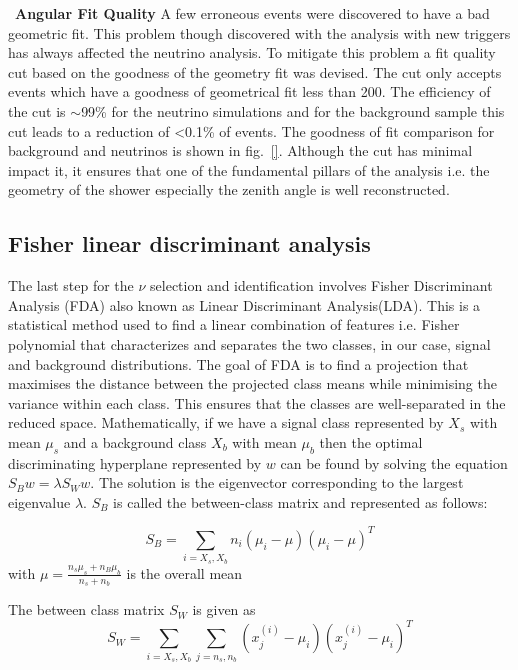 \begin{description}
  \item ~\textbf{Angular Fit Quality} A few erroneous events were discovered to have a bad geometric fit. This problem though discovered with the analysis with new triggers has always affected the neutrino analysis. To mitigate this problem a fit quality cut based on the goodness of the geometry fit was devised. The cut only accepts events which have a goodness of geometrical fit less than 200. The efficiency of the cut is $\sim$99\% for the neutrino simulations and for the background sample this cut leads to a reduction of <0.1\% of events. The goodness of fit comparison for background and neutrinos is shown in fig.~\ref{}. Although the cut has minimal impact it, it ensures that one of the fundamental pillars of the analysis i.e. the geometry of the shower especially the zenith angle is well reconstructed.
\end{description} 

\subsection{Fisher linear discriminant analysis}
\label{subsec:nu_sel_fisher}
The last step for the $\nu$ selection and identification involves Fisher Discriminant Analysis (FDA) also known as Linear Discriminant Analysis(LDA). This is a statistical method used to find a linear combination of features i.e. Fisher polynomial that characterizes and separates the two classes, in our case, signal and background distributions. The goal of FDA is to find a projection that maximises the distance between the projected class means while minimising the variance within each class. This ensures that the classes are well-separated in the reduced space. Mathematically, if we have a signal class represented by $X_s$ with mean $\mu_s$ and a background class $X_b$ with mean $\mu_b$ then the optimal discriminating hyperplane represented by $w$ can be found by solving the equation $S_B w = \lambda S_W w$. The solution is the eigenvector corresponding to the largest eigenvalue $\lambda$. $S_B$ is called the between-class matrix and represented as follows: 

\begin{equation}
  S_B = \sum_{i = X_s,X_b} n_i (\mu_i - \mu)(\mu_i - \mu)^T
\end{equation}
with $\mu = \frac{n_s \mu_s + n_B \mu_b}{n_s + n_b}$ is the overall mean 

The between class matrix $S_W$ is given as
\begin{equation}
  S_W = \sum_{i = X_s,X_b} \sum_{j = n_s,n_b } (x^{(i)}_j - \mu_i) (x^{(i)}_j - \mu_i)^T
\end{equation}

